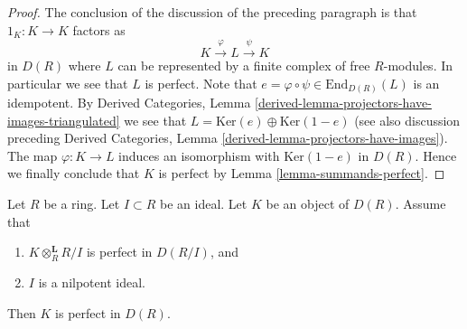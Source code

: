 \begin{proof}
\medskip\noindent
The conclusion of the discussion of the preceding paragraph is that
$1_K : K \to K$ factors as
$$
K \xrightarrow{\varphi} L \xrightarrow{\psi} K
$$
in $D(R)$ where $L$ can be represented by a finite
complex of free $R$-modules. In particular we see that $L$ is
perfect. Note that $e = \varphi \circ \psi \in \text{End}_{D(R)}(L)$
is an idempotent. By Derived Categories,
Lemma \ref{derived-lemma-projectors-have-images-triangulated}
we see that $L = \text{Ker}(e) \oplus \text{Ker}(1 - e)$
(see also discussion preceding
Derived Categories, Lemma \ref{derived-lemma-projectors-have-images}).
The map $\varphi : K \to L$ induces an isomorphism with
$\text{Ker}(1 - e)$ in $D(R)$. Hence we finally conclude that
$K$ is perfect by Lemma \ref{lemma-summands-perfect}.
\end{proof}

\begin{lemma}
\label{lemma-perfect-modulo-nilpotent-ideal}
Let $R$ be a ring. Let $I \subset R$ be an ideal.
Let $K$ be an object of $D(R)$. Assume that
\begin{enumerate}
\item $K \otimes_R^\mathbf{L} R/I$ is perfect in $D(R/I)$, and
\item $I$ is a nilpotent ideal.
\end{enumerate}
Then $K$ is perfect in $D(R)$.
\end{lemma}

